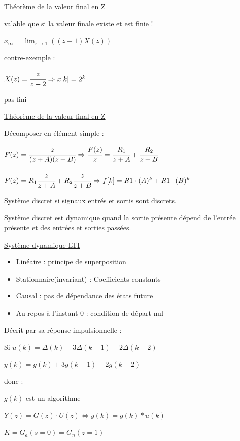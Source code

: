 
\underline{Théorème  de la valeur final en Z}

valable que si la valeur finale existe et est finie !

$x_\infty = \lim_{z\rightarrow 1} ((z-1)X(z))$

contre-exemple :

$X(z) = \cfrac{z}{z-2} \Rightarrow x[k] = 2^k$

pas fini

\underline{Théorème  de la valeur final en Z}

Décomposer en élément simple :

{\footnotesize
$F(z) = \cfrac{z}{(z+A)(z+B)} \Rightarrow \cfrac{F(z)}{z} = \cfrac{R_1}{z+A} + \cfrac{R_2}{z+B}$

$F(z) =R_1\cfrac{z}{z+A} + R_2\cfrac{z}{z+B}\Rightarrow f[k] = R1\cdot(A)^k+ R1\cdot(B)^k$
}

\hformbar


Système discret si signaux entrés et sortis sont discrets.

Système discret est dynamique quand la sortie présente dépend de l'entrée présente et des entrées et sorties passées.

\underline{Système dynamique LTI}

\begin{itemize}
    \item Linéaire : principe de superposition 
    \item Stationnaire(invariant) : Coefficients constants
    \item Causal : pas de dépendance des états future
    \item Au repos à l'instant 0 : condition de départ nul
\end{itemize}

Décrit par sa réponse impulsionnelle : 

Si $u(k) = \Delta(k) + 3 \Delta(k-1) - 2 \Delta(k-2)$ 

$y(k) = g(k) + 3 g(k-1) - 2g(k-2)$ 

donc : 

$g(k)$ est un algorithme 

$Y(z) = G(z) \cdot U(z) \Leftrightarrow y(k) = g(k) * u(k)$



$ K = G_a(s=0) = G_n(z = 1)$


